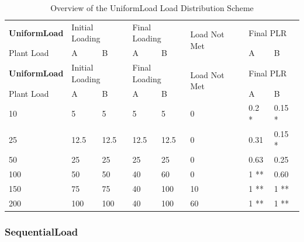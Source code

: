 \begin{longtable}[c]{|l|p{0.5in}|p{0.5in}|p{0.5in}|p{0.5in}|l|p{0.5in}|p{0.5in}|}

\caption{Overview of the UniformLoad Load Distribution Scheme}
\label{tab:uniform-load-overview}\\
\hline
\textbf{UniformLoad} & \multicolumn{2}{l|}{Initial Loading} & \multicolumn{2}{l|}{Final Loading} & \multirow{2}{*}{Load Not Met} & \multicolumn{2}{l|}{Final PLR} \\ \cline{1-5} \cline{7-8}
Plant Load           & A                 & B                & A                & B               &                               & A              & B             \\ \hline
\endfirsthead
\hline
\textbf{UniformLoad} & \multicolumn{2}{l|}{Initial Loading} & \multicolumn{2}{l|}{Final Loading} & \multirow{2}{*}{Load Not Met} & \multicolumn{2}{l|}{Final PLR} \\ \cline{1-5} \cline{7-8}
Plant Load           & A                 & B                & A                & B               &                               & A              & B             \\ \hline
\endhead

10          & 5                 & 5                & 5            & 5           & 0                      & 0.2 *      & 0.15 *      \\ \hline
25          & 12.5              & 12.5             & 12.5         & 12.5        & 0                      & 0.31       & 0.15 *      \\ \hline
50          & 25                & 25               & 25           & 25          & 0                      & 0.63       & 0.25        \\ \hline
100         & 50                & 50               & 40           & 60          & 0                      & 1 **       & 0.60        \\ \hline
150         & 75                & 75               & 40           & 100         & 10                     & 1 **       & 1 **        \\ \hline
200         & 100               & 100              & 40           & 100         & 60                     & 1 **       & 1 **        \\ \hline

\end{longtable}


\subsubsection{SequentialLoad}%
\label{ssub:sequentialload}

